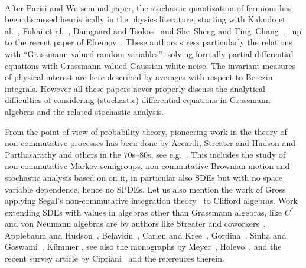 \documentclass[11pt]{article}
\begin{document}
\

After Parisi and Wu seminal paper, the stochastic quantization of fermions
has been discussed heuristically in the physics literature, starting with
Kakudo et al.~{\cite{kakudo1983gauge}}, Fukai et
al.~{\cite{fukai_stochastic_1983}}, Damgaard and
Tsokos~{\cite{damgaard_stochastic_1984}} and She--Sheng and
Ting--Chang~{\cite{she-sheng_stochastic_1985}}, \ up to the recent paper of
Efremov~{\cite{efremov_stochastic_2019}}. These authors stress particularly
the relations with ``Grassmann valued random variables'', solving formally
partial differential equations with Grassmann valued Gaussian white noise. The
invariant measures of physical interest are here described by averages with
respect to Berezin integrals. However all these papers never properly discuss
the analytical difficulties of considering (stochastic) differential equations
in Grassmann algebras and the related stochastic analysis.

From the point of view of probability theory, pioneering work in the theory of
non-commutative processes has been done by Accardi, Streater and Hudson and
Parthasarathy and others in the 70s--80s, see
e.g.~{\cite{accardi_outline_2015,parthasarathy_introduction_1992,streater_classical_2000,biane_calcul_1995}}.
This includes the study of non-commutative Markov semigroups, non-commutative
Brownian motion and stochastic analysis based on on it, in particular also
SDEs but with no space variable dependence, hence no SPDEs. Let us also
mention the work of
Gross~{\cite{gross_noncommutative_1971,gross_existence_1972,gross_hypercontractivity_1975,gross_formula_1977}}
applying Segal's non-commutative integration
theory~{\cite{segal_non_commutative_1953,nelson_notes_1974}} to Clifford
algebras. Work extending SDEs with values in algebras other than Grassmann
algebras, like $C^{\ast}$ and von Neumann algebras are by authors like
Streater and coworkers~{\cite{Streater1,Streater2,Streater3}}, Applebaum and
Hudson~{\cite{Applebaum1,Applebaum2}}, Belavkin~{\cite{Belavkin}}, Carlen and
Kree~{\cite{Carlen1}}, Gordina~{\cite{Gordina}}, Sinha and
Goswami~{\cite{Sinha}}, K{\"u}mmer {\cite{Kummer}}, see also the monographs by
Meyer~{\cite{Meyerbook}}, Holevo~{\cite{Holevo}}, and the recent survey
article by Cipriani~{\cite{Cipriani}} and the references therein.
\end{document}
